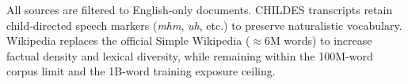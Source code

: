 \documentclass[11pt]{article}
\begin{document}
All sources are filtered to English-only documents.
CHILDES transcripts retain child-directed speech markers
(\textit{mhm}, \textit{uh}, etc.) to preserve naturalistic
vocabulary.
Wikipedia replaces the official Simple Wikipedia
(${\approx}6$M words) to increase factual density and
lexical diversity, while remaining within the 100M-word corpus
limit and the 1B-word training exposure ceiling.
\end{document}
